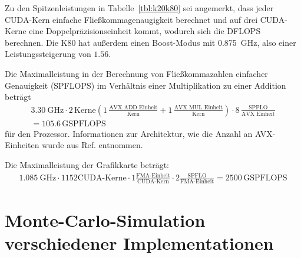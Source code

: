 Zu den Spitzenleistungen in Tabelle~\ref{tbl:k20k80} sei angemerkt, dass jeder CUDA-Kern einfache Fließkommagenaugigkeit berechnet und auf drei CUDA-Kerne eine Doppelpräzisionseinheit kommt, wodurch sich die DFLOPS berechnen.
Die K80 hat außerdem einen Boost-Modus mit \SI{0.875}{\giga\hertz}, also einer Leistungssteigerung von $1.56$.

Die Maximalleistung in der Berechnung von Fließkommazahlen einfacher Genauigkeit (SPFLOPS) im Verhältnis einer Multiplikation zu einer Addition beträgt
\begin{align}
	\SI{3.30}{\giga\hertz} \cdot
	2\,\text{Kerne} \left(
		1\,\frac{ \text{AVX ADD Einheit} }{ \text{Kern} } +
		1\,\frac{ \text{AVX MUL Einheit} }{ \text{Kern} }
	\right) \cdot
	8\,\frac{ \text{SPFLO} }{ \text{AVX Einheit} } \\
	= 105.6\,\text{GSPFLOPS}
\end{align}
für den Prozessor. Informationen zur Architektur, wie die Anzahl an AVX-Einheiten wurde aus Ref.\cite{cesga} entnommen.

Die Maximalleistung der Grafikkarte beträgt:
\begin{align}
	\SI{1.085}{\giga\hertz} \cdot 1152 \text{CUDA-Kerne} \cdot
	1 \frac{ \text{FMA-Einheit} }{ \text{CUDA-Kern} } \cdot
	2 \frac{ \text{SPFLO} }{ \text{FMA-Einheit} }
	= 2500\,\text{GSPFLOPS}
\end{align}

\section{Monte-Carlo-Simulation verschiedener Implementationen}

